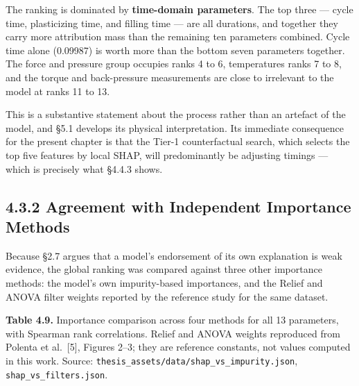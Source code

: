 The ranking is dominated by \textbf{time-domain parameters}. The top three --- cycle time, plasticizing time, and filling time --- are all durations, and together they carry more attribution mass than the remaining ten parameters combined. Cycle time alone (0.09987) is worth more than the bottom seven parameters together. The force and pressure group occupies ranks 4 to 6, temperatures ranks 7 to 8, and the torque and back-pressure measurements are close to irrelevant to the model at ranks 11 to 13.

This is a substantive statement about the process rather than an artefact of the model, and §5.1 develops its physical interpretation. Its immediate consequence for the present chapter is that the Tier-1 counterfactual search, which selects the top five features by local \textbar SHAP\textbar, will predominantly be adjusting timings --- which is precisely what §4.4.3 shows.

\hypertarget{agreement-with-independent-importance-methods}{%
\subsection{4.3.2 Agreement with Independent Importance Methods}\label{agreement-with-independent-importance-methods}}

Because §2.7 argues that a model's endorsement of its own explanation is weak evidence, the global ranking was compared against three other importance methods: the model's own impurity-based importances, and the Relief and ANOVA filter weights reported by the reference study for the same dataset.

\textbf{Table 4.9.} Importance comparison across four methods for all 13 parameters, with Spearman rank correlations. Relief and ANOVA weights reproduced from Polenta et al.~{[}5{]}, Figures 2--3; they are reference constants, not values computed in this work. Source: \texttt{thesis\_assets/data/shap\_vs\_impurity.json}, \texttt{shap\_vs\_filters.json}.

